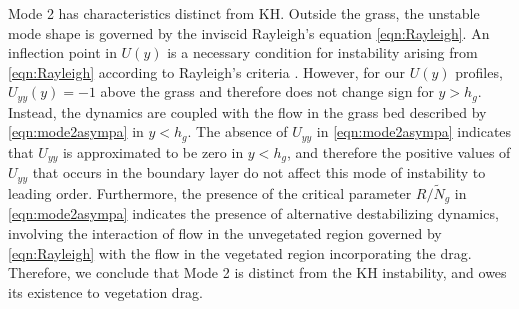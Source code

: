 \documentclass{jfm}
\newcommand{\hg}{h_g}
\renewcommand{\Rey}{{R}}
\newcommand{\Ndg}{\tilde{N}_g}
\begin{document}
Mode 2 has characteristics distinct from KH. Outside the grass, the unstable mode shape is governed by the inviscid Rayleigh's equation \eqref{eqn:Rayleigh}.
An inflection point in $U(y)$ is a necessary condition for instability arising from \eqref{eqn:Rayleigh} according to Rayleigh's criteria \citep{Rayleigh1879}. 
However, for our $U(y)$ profiles, $U_{yy}(y) = -1$ above the grass and therefore does not change sign for $y>\hg$. 
Instead, the dynamics are coupled with the flow in the grass bed described by \eqref{eqn:mode2asympa} in $y< \hg$.
The absence of $U_{yy}$ in \eqref{eqn:mode2asympa} indicates that $U_{yy}$ is approximated to be zero in $y<\hg$, and therefore the positive values of $U_{yy}$ that occurs in the boundary layer do not affect this mode of instability to leading order.
Furthermore, the presence of the critical parameter $\Rey/\Ndg$ in \eqref{eqn:mode2asympa} indicates the presence of alternative destabilizing dynamics, involving the interaction of flow in the unvegetated region governed by \eqref{eqn:Rayleigh} with the flow in the vegetated region incorporating the drag.
Therefore, we conclude that Mode 2 is distinct from the KH instability, and owes its existence to vegetation drag.

\end{document}
